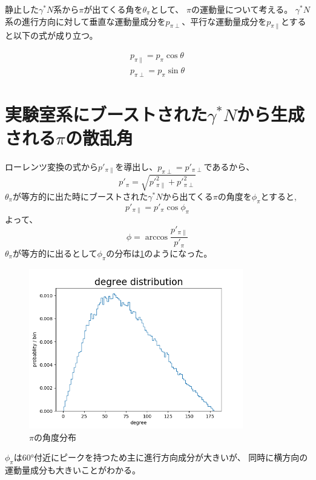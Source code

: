 静止した$\gamma^* N$系から$\pi$が出てくる角を$\theta_\pi$として、
$\pi$の運動量について考える。
$\gamma^* N$系の進行方向に対して垂直な運動量成分を$p_{\pi \perp}$、平行な運動量成分を$p_{\pi \parallel}$とすると以下の式が成り立つ。

\begin{eqnarray}
    p_{\pi \parallel} = p_\pi  \cos\theta \\
    p_{\pi \perp} = p_\pi \sin\theta
\end{eqnarray}

\section{\texorpdfstring{実験室系にブーストされた$\gamma^* N$から生成される$\pi$の散乱角}{LG}}
ローレンツ変換の式から$p'_{\pi \parallel}$を導出し、$p_{\pi \perp} = p'_{\pi \perp}$であるから、
\begin{equation}
    p'_\pi = \sqrt{p'^2_{\pi \parallel} + p'^2_{\pi \perp} }
\end{equation}
$\theta_\pi$が等方的に出た時にブーストされた$\gamma^* N$から出てくる$\pi$の角度を$\phi_\pi$とすると,
\begin{equation}
    p'_{\pi \parallel} = p'_\pi \cos{\phi_\pi}
\end{equation}
よって、
\begin{equation}
    \phi = \arccos{\dfrac{p'_{\pi \parallel}}{p'_\pi}}
\end{equation}
$\theta_\pi$が等方的に出るとして$\phi_\pi$の分布は\ref{fig:angle8}のようになった。
\begin{figure}[H]
    \centering
    \includegraphics[height=7cm]{img/degree_distribution.png}
    \caption{$\pi$の角度分布}
    \label{fig:angle8}
\end{figure}
$\phi_\pi$は60°付近にピークを持つため主に進行方向成分が大きいが、
同時に横方向の運動量成分も大きいことがわかる。